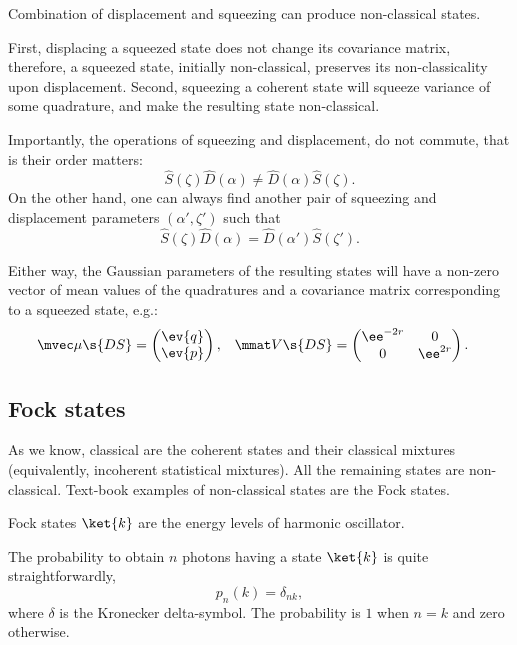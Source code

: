 \documentclass[fontsize=9pt,bookmarkpackage=false]{scrartcl}
\begin{document}
Combination of displacement and squeezing can produce non-classical states.

First, displacing a squeezed state does not change its covariance matrix, therefore, a squeezed state, initially non-classical, preserves its non-classicality upon displacement.
Second, squeezing a coherent state will squeeze variance of some quadrature, and make the resulting state non-classical.

Importantly, the operations of squeezing and displacement, do not commute, that is their order matters:
\begin{equation}
  \hat S ( \zeta ) \hat D ( \alpha )  \neq \hat D (\alpha ) \hat S ( \zeta ).
\end{equation}
On the other hand, one can always find another pair of squeezing and displacement parameters $(\alpha', \zeta')$ such that
\begin{equation}
  \hat S ( \zeta ) \hat D ( \alpha ) = \hat D (\alpha' ) \hat S ( \zeta' ).
\end{equation}

Either way, the Gaussian parameters of the resulting states will have a non-zero vector of mean values of the quadratures and a covariance matrix corresponding to a squeezed state, e.g.:
\begin{align}
  \mvec \mu\s{DS} & =
  \begin{pmatrix}
    \ev{q} \\ \ev{ p}
  \end{pmatrix},
  &
  \mmat V\s{DS} & =
  \begin{pmatrix}
    \ee^{ - 2 r } & 0 
    \\
    0 & \ee^{ 2 r }
  \end{pmatrix}.
\end{align}

\subsection{Fock states} %
\label{sec:fock_states}

As we know, classical are the coherent states and their classical mixtures (equivalently, incoherent statistical mixtures).
All the remaining states are non-classical.
Text-book examples of non-classical states are the Fock states.

Fock states $\ket{k}$ are the energy levels of harmonic oscillator.

The probability to obtain $n$ photons having a state $\ket{k}$ is quite straightforwardly,
\begin{equation}
  p_n (k) = \delta_{nk },
\end{equation}
where $\delta$ is the Kronecker delta-symbol.
The probability is $1$ when $n = k$ and zero otherwise.
\end{document}
